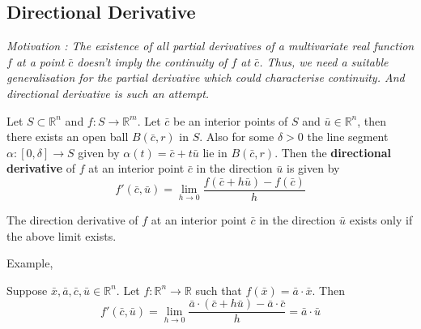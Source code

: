 \subsection{Directional Derivative}
\textsl{Motivation : The existence of all partial derivatives of a multivariate real function $f$ at a point $\bar{c}$ doesn't imply the continuity of $f$ at $\bar{c}$.
	Thus, we need a suitable generalisation for the partial derivative which could characterise continuity.
	And directional derivative is such an attempt.}

\begin{definition}
	Let \(S \subset \mathbb{R}^n\) and \(f : S \to \mathbb{R}^m\).
	Let $\bar{c}$ be an interior points of $S$ and \( \bar{u} \in \mathbb{R}^n \), then there exists an open ball $B(\bar{c},r)$ in $S$.
	Also for some $\delta > 0$ the line segment \( \alpha : [0,\delta] \to S \) given by \( \alpha(t) = \bar{c}+t\bar{u} \) lie in $B(\bar{c},r)$.
	Then the \textbf{directional derivative} of $f$ at an interior point $\bar{c}$ in the direction $\bar{u}$ is given by
	\[ f'(\bar{c},\bar{u}) = \lim_{h \to 0} \frac{f(\bar{c}+h\bar{u}) - f(\bar{c})}{h} \]
\end{definition}

\begin{remark}
	The direction derivative of $f$ at an interior point $\bar{c}$ in the direction $\bar{u}$ exists only if the above limit exists.
\end{remark}

\begin{remark}Example, \cite[Exercise 12.2a]{apostol}

Suppose \(\bar{x},\bar{a},\bar{c},\bar{u} \in \mathbb{R}^n\).
Let \(f : \mathbb{R}^n \to \mathbb{R}\) such that \(f(\bar{x}) = \bar{a}\cdot\bar{x}\).
Then \[ f'(\bar{c},\bar{u}) = \lim_{h \to 0} \frac{\bar{a}\cdot(\bar{c}+h\bar{u}) - \bar{a} \cdot \bar{c}}{h} = \bar{a} \cdot \bar{u}\]
\end{remark}

